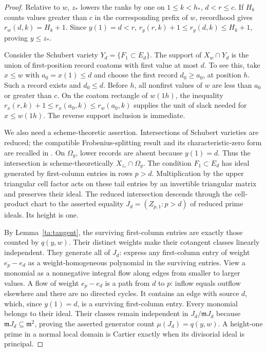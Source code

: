 \begin{proof}
Relative to $w$, $z_*$ lowers the ranks by one on
$1\leq k<h_*$, $d<r\leq c$. If $H_k$ counts values greater than
$c$ in the corresponding prefix of $w$, recordhood gives
$r_w(d,k)=H_k+1$. Since $y(1)=d<r$,
$r_y(r,k)+1\leq r_y(d,k)\leq H_k+1$, proving $y\leq z_*$.

Consider the Schubert variety $Y_d=\{F_1\subset E_d\}$.
The support of $X_w\cap Y_d$ is the union of first-position record
coatoms with first value at most $d$. To see this, take $x\leq w$
with $a_0=x(1)\leq d$ and choose the first record $d_0\geq a_0$,
at position $h$. Such a record exists and $d_0\leq d$.
Before $h$, all nonfirst values of $w$ are less than $a_0$ or greater
than $c$. On the coatom rectangle of $w(1h)$, the inequality
$r_x(r,k)+1\leq r_x(a_0,k)\leq r_w(a_0,k)$ supplies the unit of
slack needed for $x\leq w(1h)$. The reverse support inclusion is
immediate.

We also need a scheme-theoretic assertion. Intersections of Schubert
varieties are reduced; the compatible Frobenius-splitting result and
its characteristic-zero form are recalled in
\cite[Section 2, p.~2474]{Kum17}. On $\Omega_y$, lower records are
absent because $y(1)=d$. Thus the intersection is scheme-theoretically
$X_{z_*}\cap\Omega_y$. The condition $F_1\subset E_d$ has ideal
generated by first-column entries in rows $p>d$.
Multiplication by the upper triangular cell factor acts on these tail
entries by an invertible triangular matrix and preserves their ideal.
The reduced intersection descends through the cell-product chart to the
asserted equality $J_d=(Z_{p,1}:p>d)$ of reduced prime ideals.
Its height is one.

By Lemma~\ref{ta:tangent}, the surviving first-column entries are
exactly those counted by $q(y,w)$. Their distinct weights make their
cotangent classes linearly independent. They generate all of $J_d$:
express any first-column entry of weight $e_p-e_d$ as a
weight-homogeneous polynomial in the surviving entries.
View a monomial as a nonnegative integral flow along edges from
smaller to larger values. A flow of weight $e_p-e_d$ is a path from
$d$ to $p$: inflow equals outflow elsewhere and there are no directed
cycles. It contains an edge with source $d$, which, since $y(1)=d$,
is a surviving first-column entry. Every monomial belongs to their
ideal. Their classes remain independent in $J_d/\mathfrak mJ_d$
because $\mathfrak mJ_d\subseteq\mathfrak m^2$, proving
the asserted generator count $\mu(J_d)=q(y,w)$. A height-one prime in a normal local
domain is Cartier exactly when its divisorial ideal is principal.
\end{proof}

